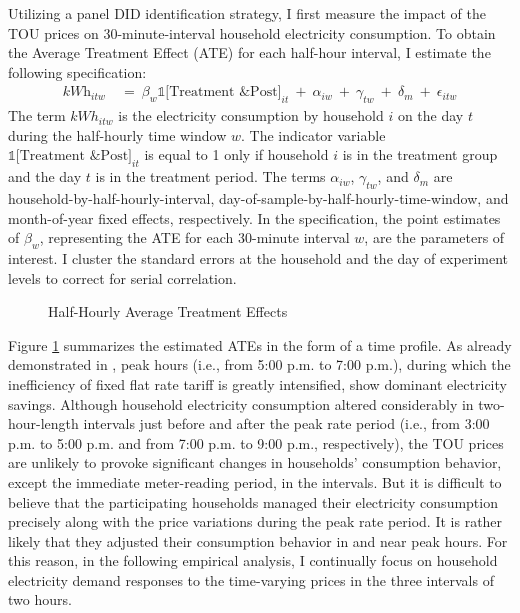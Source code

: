 Utilizing a panel DID identification strategy, I first measure the impact of the TOU prices on 30-minute-interval household electricity consumption. To obtain the Average Treatment Effect (ATE) for each half-hour interval, I estimate the following specification:
\begin{equation}
\begin{split}
    \textit{kWh}_{itw} \ 
    & = \ \beta_{w} \mathbb{1}\big[ \text{Treatment \& Post} \big]_{it} \ + \ \alpha_{iw} \ + \ \gamma_{tw} \ + \ \delta_{m} \ + \ \epsilon_{itw}
\end{split}
\label{Eq:Model-Specification_Half-Hourly-Average-Treatment-Effects}
\end{equation}
The term $kWh_{itw}$ is the electricity consumption by household $i$ on the day $t$ during the half-hourly time window $w$. The indicator variable $\mathbb{1}\big[ \text{Treatment \& Post} \big]_{it}$ is equal to 1 only if household $i$ is in the treatment group and the day $t$ is in the treatment period. The terms $\alpha_{iw}$, $\gamma_{tw}$, and $\delta_{m}$ are household-by-half-hourly-interval, day-of-sample-by-half-hourly-time-window, and month-of-year fixed effects, respectively. In the specification, the point estimates of $\beta_{w}$, representing the ATE for each 30-minute interval $w$, are the parameters of interest. I cluster the standard errors at the household and the day of experiment levels to correct for serial correlation.

\begin{figure}
    \caption{Half-Hourly Average Treatment Effects}
    \label{Figure:Half-Hourly-Average-Treatment-Effects}
\end{figure}

Figure \ref{Figure:Half-Hourly-Average-Treatment-Effects} summarizes the estimated ATEs in the form of a time profile. As already demonstrated in \cite{Peaking-Interest:How-Awareness-Drives-the-Effectiveness-of-Time-of-Use-Electricity-Pricing_Prest_2020}, peak hours (i.e., from 5:00 p.m. to 7:00 p.m.), during which the inefficiency of fixed flat rate tariff is greatly intensified, show dominant electricity savings. Although household electricity consumption altered considerably in two-hour-length intervals just before and after the peak rate period (i.e., from 3:00 p.m. to 5:00 p.m. and from 7:00 p.m. to 9:00 p.m., respectively), the TOU prices are unlikely to provoke significant changes in households' consumption behavior, except the immediate meter-reading period, in the intervals. But it is difficult to believe that the participating households managed their electricity consumption precisely along with the price variations during the peak rate period. It is rather likely that they adjusted their consumption behavior in and near peak hours. For this reason, in the following empirical analysis, I continually focus on household electricity demand responses to the time-varying prices in the three intervals of two hours. 